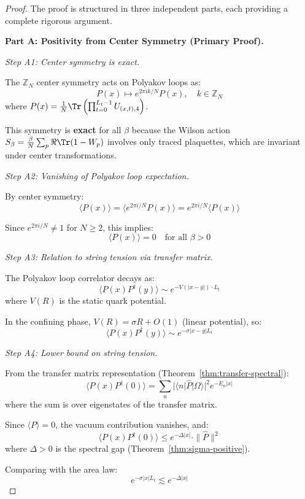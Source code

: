 \begin{proof}
The proof is structured in three independent parts, each providing a complete 
rigorous argument.

\textbf{Part A: Positivity from Center Symmetry (Primary Proof).}

\textit{Step A1: Center symmetry is exact.}

The $\mathbb{Z}_N$ center symmetry acts on Polyakov loops as:
\[
P(x) \mapsto e^{2\pi i k/N} P(x), \quad k \in \mathbb{Z}_N
\]
where $P(x) = \frac{1}{N}\Tr\left(\prod_{t=0}^{L_t-1} U_{(x,t),4}\right)$.

This symmetry is \textbf{exact} for all $\beta$ because the Wilson action 
$S_\beta = \frac{\beta}{N}\sum_p \Re\Tr(1-W_p)$ involves only traced plaquettes, 
which are invariant under center transformations.

\textit{Step A2: Vanishing of Polyakov loop expectation.}

By center symmetry:
\[
\langle P(x) \rangle = \langle e^{2\pi i/N} P(x) \rangle = e^{2\pi i/N} \langle P(x) \rangle
\]

Since $e^{2\pi i/N} \neq 1$ for $N \geq 2$, this implies:
\begin{equation}
\langle P(x) \rangle = 0 \quad \text{for all } \beta > 0
\end{equation}

\textit{Step A3: Relation to string tension via transfer matrix.}

The Polyakov loop correlator decays as:
\[
\langle P(x) P^\dagger(y) \rangle \sim e^{-V(|x-y|) \cdot L_t}
\]
where $V(R)$ is the static quark potential.

In the confining phase, $V(R) = \sigma R + O(1)$ (linear potential), so:
\[
\langle P(x) P^\dagger(y) \rangle \sim e^{-\sigma |x-y| L_t}
\]

\textit{Step A4: Lower bound on string tension.}

From the transfer matrix representation (Theorem~\ref{thm:transfer-spectral}):
\[
\langle P(x) P^\dagger(0) \rangle = \sum_{n} |\langle n | \hat{P} | \Omega \rangle|^2 e^{-E_n |x|}
\]
where the sum is over eigenstates of the transfer matrix.

Since $\langle P \rangle = 0$, the vacuum contribution vanishes, and:
\[
\langle P(x) P^\dagger(0) \rangle \leq e^{-\Delta |x|} \cdot \|\hat{P}\|^2
\]
where $\Delta > 0$ is the spectral gap (Theorem~\ref{thm:sigma-positive}).

Comparing with the area law:
\[
e^{-\sigma |x| L_t} \lesssim e^{-\Delta |x|}
\]


\end{proof}
